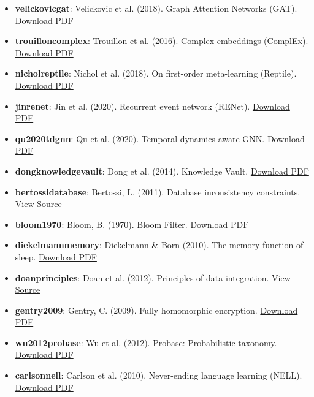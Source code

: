 \documentclass[10pt,journal,compsoc]{IEEEtran}
\begin{document}
\begin{itemize}
\item \textbf{velic\-kovic\-gat}: Velickovic et al. (2018). Graph Attention Networks (GAT). \href{https://arxiv.org/pdf/1710.10903.pdf}{Download PDF}
\item \textbf{trouillon\-complex}: Trouillon et al. (2016). Complex embeddings (ComplEx). \href{https://arxiv.org/pdf/1606.06357.pdf}{Download PDF}
\item \textbf{nichol\-reptile}: Nichol et al. (2018). On first-order meta-learning (Reptile). \href{https://arxiv.org/pdf/1803.02999.pdf}{Download PDF}
\item \textbf{jin\-renet}: Jin et al. (2020). Recurrent event network (RENet). \href{https://arxiv.org/pdf/2004.13524.pdf}{Download PDF}
\item \textbf{qu2020tdgnn}: Qu et al. (2020). Temporal dynamics-aware GNN. \href{https://arxiv.org/pdf/2002.04873.pdf}{Download PDF}
\item \textbf{dong\-knowl\-edgevault}: Dong et al. (2014). Knowledge Vault. \href{https://research.google/pubs/knowledge-vault-a-web-scale-infrastructure-for-data-fusion.pdf}{Download PDF}
\item \textbf{bertossi\-database}: Bertossi, L. (2011). Database incon\-sistency constraints. \href{https://www.morganclaypool.com/doi/abs/10.2200/S00305ED1V01Y201010DTM011}{View Source}
\item \textbf{bloom1970}: Bloom, B. (1970). Bloom Filter. \href{http://crystal.uta.edu/~mcguigan/cse6339/papers/Bloom70.pdf}{Download PDF}
\item \textbf{dieke\-lmann\-memory}: Diekelmann \& Born (2010). The memory function of sleep. \href{https://www.nature.com/articles/nrn2762.pdf}{Download PDF}
\item \textbf{doan\-princ\-iples}: Doan et al. (2012). Principles of data integration. \href{https://www.sciencedirect.com/book/9780124158146/principles-of-data-integration}{View Source}
\item \textbf{gentry2009}: Gentry, C. (2009). Fully homomorphic encryption. \href{https://crypto.stanford.edu/craig/craig-thesis.pdf}{Download PDF}
\item \textbf{wu2012probase}: Wu et al. (2012). Probase: Probab\-ilistic taxonomy. \href{https://www.cs.uwyo.edu/~ruben/cs5011/probase.pdf}{Download PDF}
\item \textbf{carlson\-nell}: Carlson et al. (2010). Never-ending language learning (NELL). \href{http://www.cs.cmu.edu/~acarlson/papers/carlson-aaai10.pdf}{Download PDF}

\end{itemize}
\end{document}
